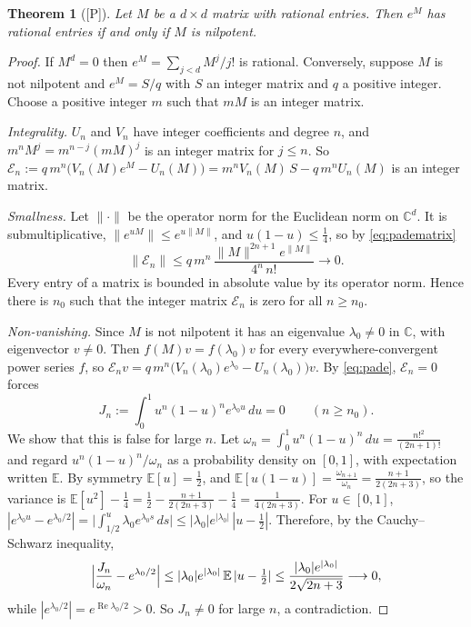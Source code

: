 \documentclass[11pt,a4paper]{article}
\newcommand{\C}{\mathbb C}
\newcommand{\dd}{\,d}
\newcommand{\st}[1]{\textsf{[#1]}}
\newtheorem{theorem}{Theorem}
\theoremstyle{definition}
\begin{document}
\begin{theorem}[\st{P}]\label{thm:matrix}
Let $M$ be a $d\times d$ matrix with rational entries. Then $e^M$ has rational entries if and only if
$M$ is nilpotent.
\end{theorem}
\begin{proof}
If $M^d=0$ then $e^M=\sum_{j<d}M^j/j!$ is rational. Conversely, suppose $M$ is not nilpotent and
$e^M=S/q$ with $S$ an integer matrix and $q$ a positive integer. Choose a positive integer $m$ such
that $mM$ is an integer matrix.

\emph{Integrality.} $U_n$ and $V_n$ have integer coefficients and degree $n$, and
$m^nM^j=m^{n-j}(mM)^j$ is an integer matrix for $j\le n$. So
$\mathcal E_n:=q\,m^n\bigl(V_n(M)e^M-U_n(M)\bigr)=m^nV_n(M)\,S-q\,m^nU_n(M)$ is an integer matrix.

\emph{Smallness.} Let $\|\cdot\|$ be the operator norm for the Euclidean norm on $\C^d$. It is
submultiplicative, $\|e^{uM}\|\le e^{u\|M\|}$, and $u(1-u)\le\frac14$, so by
\eqref{eq:padematrix}
\[
\|\mathcal E_n\|\le q\,m^n\,\frac{\|M\|^{2n+1}e^{\|M\|}}{4^n\,n!}\longrightarrow0 .
\]
Every entry of a matrix is bounded in absolute value by its operator norm. Hence there is $n_0$ such
that the integer matrix $\mathcal E_n$ is zero for all $n\ge n_0$.

\emph{Non-vanishing.} Since $M$ is not nilpotent it has an eigenvalue $\lambda_0\ne0$ in $\C$, with
eigenvector $v\ne0$. Then $f(M)v=f(\lambda_0)v$ for every everywhere-convergent power series $f$, so
$\mathcal E_nv=q\,m^n\bigl(V_n(\lambda_0)e^{\lambda_0}-U_n(\lambda_0)\bigr)v$. By \eqref{eq:pade}, $\mathcal E_n=0$
forces
\[
J_n:=\int_0^1u^n(1-u)^ne^{\lambda_0u}\dd u=0\qquad(n\ge n_0).
\]
We show that this is false for large $n$. Let $\omega_n=\int_0^1u^n(1-u)^n\dd u=\frac{n!^2}{(2n+1)!}$
and regard $u^n(1-u)^n/\omega_n$ as a probability density on $[0,1]$, with expectation written
$\mathbb E$. By symmetry $\mathbb E[u]=\frac12$, and
$\mathbb E[u(1-u)]=\frac{\omega_{n+1}}{\omega_n}=\frac{n+1}{2(2n+3)}$, so the variance is
$\mathbb E[u^2]-\frac14=\frac12-\frac{n+1}{2(2n+3)}-\frac14=\frac1{4(2n+3)}$. For $u\in[0,1]$,
$|e^{\lambda_0u}-e^{\lambda_0/2}|=\bigl|\int_{1/2}^u\lambda_0e^{\lambda_0s}\dd s\bigr|\le
|\lambda_0|e^{|\lambda_0|}\,|u-\tfrac12|$. Therefore, by the Cauchy--Schwarz inequality,
\[
\Bigl|\frac{J_n}{\omega_n}-e^{\lambda_0/2}\Bigr|\le|\lambda_0|e^{|\lambda_0|}\,\mathbb E\,|u-\tfrac12|
\le\frac{|\lambda_0|e^{|\lambda_0|}}{2\sqrt{2n+3}}\longrightarrow0 ,
\]
while $|e^{\lambda_0/2}|=e^{\operatorname{Re}\lambda_0/2}>0$. So $J_n\ne0$ for large $n$, a
contradiction.
\end{proof}
\end{document}
